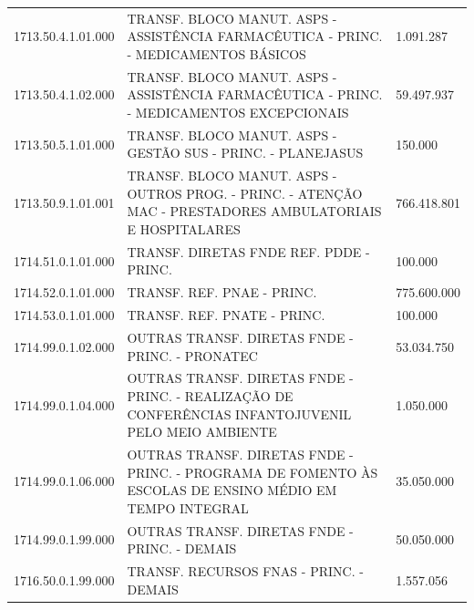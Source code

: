 \documentclass{article}
\begin{document}
\begin{longtable}[c]{m{2cm}|m{13cm}|m{2cm}}
\multicolumn{1}{C{2cm}|}{1713.50.4.1.01.000} & \multicolumn{1}{L{13cm}|}{TRANSF. BLOCO MANUT. ASPS - ASSISTÊNCIA FARMACÊUTICA - PRINC. - MEDICAMENTOS BÁSICOS} & \multicolumn{1}{R{2cm}}{1.091.287} \\
\multicolumn{1}{C{2cm}|}{1713.50.4.1.02.000} & \multicolumn{1}{L{13cm}|}{TRANSF. BLOCO MANUT. ASPS - ASSISTÊNCIA FARMACÊUTICA - PRINC. - MEDICAMENTOS EXCEPCIONAIS} & \multicolumn{1}{R{2cm}}{59.497.937} \\
\multicolumn{1}{C{2cm}|}{1713.50.5.1.01.000} & \multicolumn{1}{L{13cm}|}{TRANSF. BLOCO MANUT. ASPS - GESTÃO SUS - PRINC. - PLANEJASUS} & \multicolumn{1}{R{2cm}}{150.000} \\
\multicolumn{1}{C{2cm}|}{1713.50.9.1.01.001} & \multicolumn{1}{L{13cm}|}{TRANSF. BLOCO MANUT. ASPS - OUTROS PROG. - PRINC. - ATENÇÃO MAC - PRESTADORES AMBULATORIAIS E HOSPITALARES} & \multicolumn{1}{R{2cm}}{766.418.801} \\
\multicolumn{1}{C{2cm}|}{1714.51.0.1.01.000} & \multicolumn{1}{L{13cm}|}{TRANSF. DIRETAS FNDE REF. PDDE - PRINC.} & \multicolumn{1}{R{2cm}}{100.000} \\
\multicolumn{1}{C{2cm}|}{1714.52.0.1.01.000} & \multicolumn{1}{L{13cm}|}{TRANSF. REF. PNAE - PRINC.} & \multicolumn{1}{R{2cm}}{775.600.000} \\
\multicolumn{1}{C{2cm}|}{1714.53.0.1.01.000} & \multicolumn{1}{L{13cm}|}{TRANSF. REF. PNATE - PRINC.} & \multicolumn{1}{R{2cm}}{100.000} \\
\multicolumn{1}{C{2cm}|}{1714.99.0.1.02.000} & \multicolumn{1}{L{13cm}|}{OUTRAS TRANSF. DIRETAS FNDE - PRINC. - PRONATEC} & \multicolumn{1}{R{2cm}}{53.034.750} \\
\multicolumn{1}{C{2cm}|}{1714.99.0.1.04.000} & \multicolumn{1}{L{13cm}|}{OUTRAS TRANSF. DIRETAS FNDE - PRINC. - REALIZAÇÃO DE CONFERÊNCIAS INFANTOJUVENIL PELO MEIO AMBIENTE} & \multicolumn{1}{R{2cm}}{1.050.000} \\
\multicolumn{1}{C{2cm}|}{1714.99.0.1.06.000} & \multicolumn{1}{L{13cm}|}{OUTRAS TRANSF. DIRETAS FNDE - PRINC. - PROGRAMA DE FOMENTO ÀS ESCOLAS DE ENSINO MÉDIO EM TEMPO INTEGRAL} & \multicolumn{1}{R{2cm}}{35.050.000} \\
\multicolumn{1}{C{2cm}|}{1714.99.0.1.99.000} & \multicolumn{1}{L{13cm}|}{OUTRAS TRANSF. DIRETAS FNDE - PRINC. - DEMAIS} & \multicolumn{1}{R{2cm}}{50.050.000} \\
\multicolumn{1}{C{2cm}|}{1716.50.0.1.99.000} & \multicolumn{1}{L{13cm}|}{TRANSF. RECURSOS FNAS - PRINC. - DEMAIS} & \multicolumn{1}{R{2cm}}{1.557.056} \\

\end{longtable}
\end{document}
